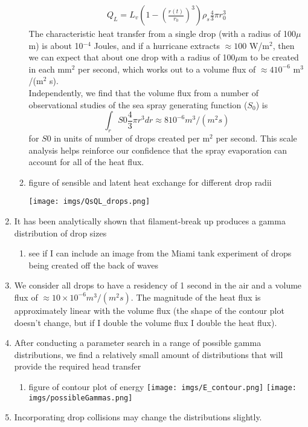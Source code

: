 \documentclass[10pt,a4paper]{article}
\begin{document}
\begin{enumerate}
\begin{enumerate}
\begin{align*}
Q_L = L_v\left(1-\left(\frac{r(t)}{r_0}\right)^3\right)\rho_s\frac{4}{3}\pi r_0^3
\end{align*}
The characteristic heat transfer from a single drop (with a radius of 100$\mu$m) is about 10$^{-4}$ Joules, and if a hurricane extracts $\approx 100$ W/m$^{2}$, then we can expect that about one drop with a radius of 100$\mu$m to be created in each mm$^2$ per second, which works out to a volume flux of $\approx 4 10^{-6}$ m$^3$/(m$^2$ s). \\
Independently, we find that the volume flux from a number of observational studies of the sea spray generating function ($S_0$) is \[ \int_r S0 \frac{4}{3}\pi r^3 dr \approx 8 10^{-6} m^3/(m^2 s)\] for $S0$ in units of number of drops created per m$^2$ per second. This scale analysis helps reinforce our confidence that the spray evaporation can account for all of the heat flux.
\item figure of sensible and latent heat exchange for different drop radii
\begin{center}
\hspace*{-2.5in}\texttt{[image: imgs/QsQL\_drops.png]}
\end{center}
\end{enumerate}
\item It has been analytically shown that filament-break up produces a gamma distribution of drop sizes
\begin{enumerate}
\item see if I can include an image from the Miami tank experiment of drops being created off the back of waves
\end{enumerate}
\item We consider all drops to have a residency of 1 second in the air and a volume flux of $\approx 10 \times 10^{-6} m^3/(m^2 s)$. The magnitude of the heat flux is approximately linear with the volume flux (the shape of the contour plot doesn't change, but if I double the volume flux I double the heat flux).
\item After conducting a parameter search in a range of possible gamma distributions, we find a relatively small amount of distributions that will provide the required head transfer
\begin{enumerate}
\item figure of contour plot of energy
\hspace*{-3in}\texttt{[image: imgs/E\_contour.png]}
\texttt{[image: imgs/possibleGammas.png]}
\end{enumerate}
\item Incorporating drop collisions may change the distributions slightly.
\end{enumerate}






\end{document}

